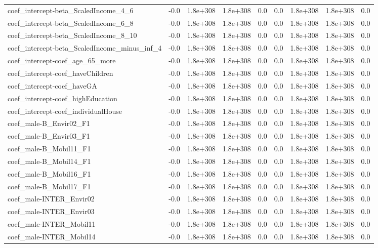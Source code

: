 \begin{tabular}{lrrrrrrrr}
coef_intercept-beta_ScaledIncome_4_6 & -0.0 & 1.8e+308 & 1.8e+308 & 0.0 & 0.0 & 1.8e+308 & 1.8e+308 & 0.0 \\
coef_intercept-beta_ScaledIncome_6_8 & -0.0 & 1.8e+308 & 1.8e+308 & 0.0 & 0.0 & 1.8e+308 & 1.8e+308 & 0.0 \\
coef_intercept-beta_ScaledIncome_8_10 & -0.0 & 1.8e+308 & 1.8e+308 & 0.0 & 0.0 & 1.8e+308 & 1.8e+308 & 0.0 \\
coef_intercept-beta_ScaledIncome_minus_inf_4 & -0.0 & 1.8e+308 & 1.8e+308 & 0.0 & 0.0 & 1.8e+308 & 1.8e+308 & 0.0 \\
coef_intercept-coef_age_65_more & -0.0 & 1.8e+308 & 1.8e+308 & 0.0 & 0.0 & 1.8e+308 & 1.8e+308 & 0.0 \\
coef_intercept-coef_haveChildren & -0.0 & 1.8e+308 & 1.8e+308 & 0.0 & 0.0 & 1.8e+308 & 1.8e+308 & 0.0 \\
coef_intercept-coef_haveGA & -0.0 & 1.8e+308 & 1.8e+308 & 0.0 & 0.0 & 1.8e+308 & 1.8e+308 & 0.0 \\
coef_intercept-coef_highEducation & -0.0 & 1.8e+308 & 1.8e+308 & 0.0 & 0.0 & 1.8e+308 & 1.8e+308 & 0.0 \\
coef_intercept-coef_individualHouse & -0.0 & 1.8e+308 & 1.8e+308 & 0.0 & 0.0 & 1.8e+308 & 1.8e+308 & 0.0 \\
coef_male-B_Envir02_F1 & -0.0 & 1.8e+308 & 1.8e+308 & 0.0 & 0.0 & 1.8e+308 & 1.8e+308 & 0.0 \\
coef_male-B_Envir03_F1 & -0.0 & 1.8e+308 & 1.8e+308 & 0.0 & 0.0 & 1.8e+308 & 1.8e+308 & 0.0 \\
coef_male-B_Mobil11_F1 & -0.0 & 1.8e+308 & 1.8e+308 & 0.0 & 0.0 & 1.8e+308 & 1.8e+308 & 0.0 \\
coef_male-B_Mobil14_F1 & -0.0 & 1.8e+308 & 1.8e+308 & 0.0 & 0.0 & 1.8e+308 & 1.8e+308 & 0.0 \\
coef_male-B_Mobil16_F1 & -0.0 & 1.8e+308 & 1.8e+308 & 0.0 & 0.0 & 1.8e+308 & 1.8e+308 & 0.0 \\
coef_male-B_Mobil17_F1 & -0.0 & 1.8e+308 & 1.8e+308 & 0.0 & 0.0 & 1.8e+308 & 1.8e+308 & 0.0 \\
coef_male-INTER_Envir02 & -0.0 & 1.8e+308 & 1.8e+308 & 0.0 & 0.0 & 1.8e+308 & 1.8e+308 & 0.0 \\
coef_male-INTER_Envir03 & -0.0 & 1.8e+308 & 1.8e+308 & 0.0 & 0.0 & 1.8e+308 & 1.8e+308 & 0.0 \\
coef_male-INTER_Mobil11 & -0.0 & 1.8e+308 & 1.8e+308 & 0.0 & 0.0 & 1.8e+308 & 1.8e+308 & 0.0 \\
coef_male-INTER_Mobil14 & -0.0 & 1.8e+308 & 1.8e+308 & 0.0 & 0.0 & 1.8e+308 & 1.8e+308 & 0.0 \\

\end{tabular}
